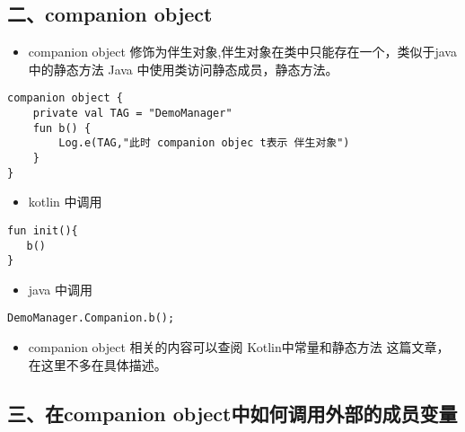 \documentclass[9pt, b5paper]{article}
\begin{document}
\subsection{二、companion object}
\label{sec-3-2}
\begin{itemize}
\item companion object 修饰为伴生对象,伴生对象在类中只能存在一个，类似于java中的静态方法 Java 中使用类访问静态成员，静态方法。
\end{itemize}
\begin{verbatim}
companion object {
    private val TAG = "DemoManager"
    fun b() {
        Log.e(TAG,"此时 companion objec t表示 伴生对象")
    }
}
\end{verbatim}
\begin{itemize}
\item kotlin 中调用
\end{itemize}
\begin{verbatim}
fun init(){
   b()
}
\end{verbatim}
\begin{itemize}
\item java 中调用
\end{itemize}
\begin{verbatim}
DemoManager.Companion.b();
\end{verbatim}
\begin{itemize}
\item companion object 相关的内容可以查阅 Kotlin中常量和静态方法 这篇文章，在这里不多在具体描述。
\end{itemize}
\subsection{三、在companion object中如何调用外部的成员变量}
\label{sec-3-3}
\end{document}
